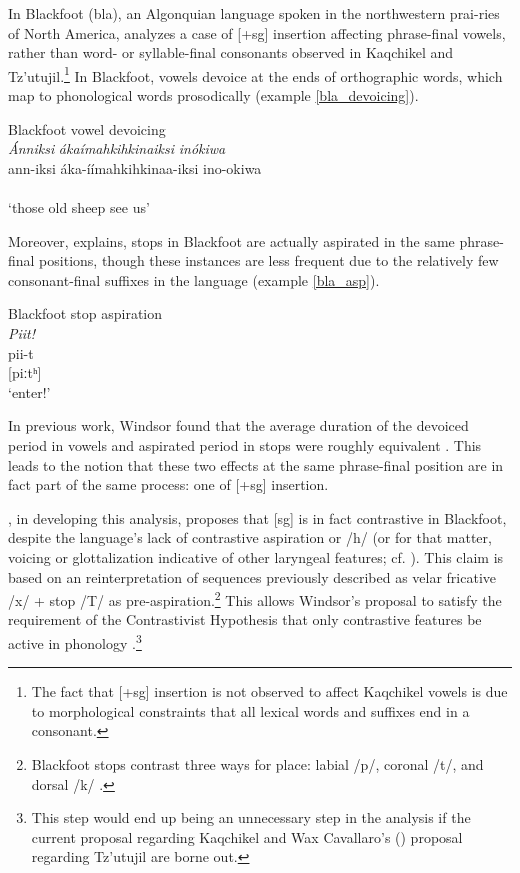 \documentclass[output=paper,colorlinks,citecolor=brown]{langscibook}
\begin{document}
In Blackfoot (bla), an Algonquian language spoken in the northwestern prai-ries of North America, \citet{windsor_2016} analyzes a case of [+sg] insertion affecting phrase-final vowels, rather than word- or syllable-final consonants observed in Kaqchikel and Tz’utujil.\footnote{The fact that [+sg] insertion is not observed to affect Kaqchikel vowels is due to morphological constraints that all lexical words and suffixes end in a consonant.} In Blackfoot, vowels devoice at the ends of orthographic words, which map to phonological words prosodically (example \ref{bla_devoicing}).

\ea\label{bla_devoicing}
    Blackfoot vowel devoicing \citep[64 (3)]{windsor_2016}\\
    \glll  \emph{Ánniksi} \emph{ákaímahkihkinaiksi} \emph{inókiwa} \\
    ann-iksi áka-íímahkihkinaa-iksi ino-okiwa \\
    [ánːiksi̥ ákɛ́ːmaxkiçkinɛksi̥ inókiʍḁ] \\
    \glt ‘those old sheep see us’
\z

Moreover, \citet{windsor_2016} explains, stops in Blackfoot are actually aspirated in the same phrase-final positions, though these instances are less frequent due to the relatively few consonant-final suffixes in the language (example \ref{bla_asp}).

\ea\label{bla_asp}
    Blackfoot stop aspiration \citep[68 (based on spectrogram in 7b)]{windsor_2016}\\
    \glll \emph{Piit!} \\
    pii-t \\
    {}[piːtʰ] \\
    \glt ‘enter!’
\z

In previous work, Windsor found that the average duration of the devoiced period in vowels and aspirated period in stops were roughly equivalent \citep{windsor_cobler_2013}. This leads to the notion that these two effects at the same phrase-final position are in fact part of the same process: one of [+sg] insertion.

\citet{windsor_2016}, in developing this analysis, proposes that [sg] is in fact contrastive in Blackfoot, despite the language’s lack of contrastive aspiration or /h/ (or for that matter, voicing or glottalization indicative of other laryngeal features; cf. \citealt{elfner_2006}). This claim is based on an reinterpretation of sequences previously described as velar fricative /x/ + stop /T/ as pre-aspiration.\footnote{Blackfoot stops contrast three ways for place: labial /p/, coronal /t/, and dorsal /k/ \citep{windsor_2016}.} This allows Windsor’s proposal to satisfy the requirement of the Contrastivist Hypothesis that only contrastive features be active in phonology \citep{hall_2007, Dresher:2009}.\footnote{This step would end up being an unnecessary step in the analysis if the current proposal regarding Kaqchikel and Wax Cavallaro’s (\citeyear{wax_cavallaro_2020}) proposal regarding Tz’utujil are borne out.}
\end{document}
